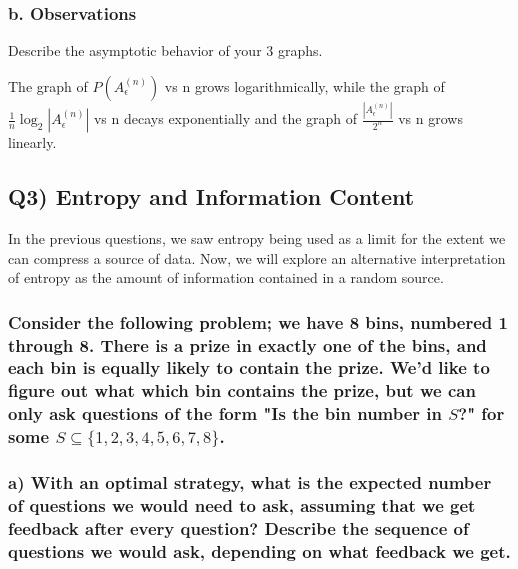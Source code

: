 \documentclass[11pt]{article}
\begin{document}
    \subsubsection{ b. Observations}\label{b.-observations}

Describe the asymptotic behavior of your 3 graphs.

    The graph of \(P(A_{\epsilon}^{(n)})\) vs n grows logarithmically, while
the graph of \(\frac{1}{n} \log_{2}{|A_{\epsilon}^{(n)}|}\) vs n decays
exponentially and the graph of \(\frac{|A_{\epsilon}^{(n)}|}{2^{n}}\) vs
n grows linearly.

    \subsection{Q3) Entropy and Information
Content}\label{q3-entropy-and-information-content}

    In the previous questions, we saw entropy being used as a limit for the
extent we can compress a source of data. Now, we will explore an
alternative interpretation of entropy as the amount of information
contained in a random source.

    \subsubsection{\texorpdfstring{Consider the following problem; we have 8
bins, numbered 1 through 8. There is a prize in exactly one of the bins,
and each bin is equally likely to contain the prize. We'd like to figure
out what which bin contains the prize, but we can only ask questions of
the form "Is the bin number in \(S\)?" for some
\(S \subseteq \{1,2,3,4,5,6,7,8\}\).}{Consider the following problem; we have 8 bins, numbered 1 through 8. There is a prize in exactly one of the bins, and each bin is equally likely to contain the prize. We'd like to figure out what which bin contains the prize, but we can only ask questions of the form "Is the bin number in S?" for some S \textbackslash{}subseteq \textbackslash{}\{1,2,3,4,5,6,7,8\textbackslash{}\}.}}\label{consider-the-following-problem-we-have-8-bins-numbered-1-through-8.-there-is-a-prize-in-exactly-one-of-the-bins-and-each-bin-is-equally-likely-to-contain-the-prize.-wed-like-to-figure-out-what-which-bin-contains-the-prize-but-we-can-only-ask-questions-of-the-form-is-the-bin-number-in-s-for-some-s-subseteq-12345678.}

    \subsubsection{ a) With an optimal strategy, what is the expected number
of questions we would need to ask, assuming that we get feedback after
every question? Describe the sequence of questions we would ask,
depending on what feedback we
get.}\label{a-with-an-optimal-strategy-what-is-the-expected-number-of-questions-we-would-need-to-ask-assuming-that-we-get-feedback-after-every-question-describe-the-sequence-of-questions-we-would-ask-depending-on-what-feedback-we-get.}
\end{document}
